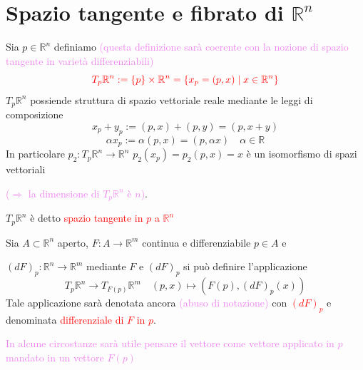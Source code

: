     \section{Spazio tangente e fibrato di \texorpdfstring{$\mathbb{R}^n$}{R\textasciicircum n}}
        \begin{definizione}
        Sia $p \in \mathbb{R}^n$ definiamo \textcolor{violet}{(questa definizione sarà coerente con la nozione di spazio tangente in varietà differenziabili)}
        \begin{equation}
        \label{eq:definizione_spazio_tangente_in_un_punto_a_Rn}
        \color{red} T_p \mathbb{R}^n := \left\{p\right\} \times \mathbb{R}^n = \left\{x_p=(p,x) \mid x \in \mathbb{R}^n \right\}
        \end{equation}
        $T_p \mathbb{R}^n$ possiende struttura di spazio vettoriale reale mediante le leggi di composizione
        \[ x_p + y_p := (p,x) + (p,y) = (p,x+y) \]
        \[ \alpha x_p := \alpha (p,x) = (p, \alpha x) \quad \alpha \in \mathbb{R}\]
        In particolare $p_2: T_p \mathbb{R}^n \to \mathbb{R}^n$ $p_2(x_p) = p_2(p,x) = x$ è un isomorfismo di spazi vettoriali 
        
        \textcolor{violet}{($\Rightarrow$ la dimensione di $T_p \mathbb{R}^n$ è $n$)}.

        $T_p \mathbb{R}^n$ è detto \textcolor{red}{spazio tangente in $p$ a $\mathbb{R}^n$}
        \end{definizione}
        \begin{definizione}
        Sia $A \subset \mathbb{R}^n$ aperto, $F: A \to \mathbb{R}^m$ continua e differenziabile $p \in A$ e 
        
        $\left(dF\right)_p: \mathbb{R}^n \to \mathbb{R}^m$ mediante $F$
        e $\left(dF\right)_p$ si può definire l'applicazione 
        \[ T_p \mathbb{R}^n \to T_{F(p)} \mathbb{R}^m \quad (p,x) \mapsto (F(p), \left(dF\right)_p(x)) \]
        Tale applicazione sarà denotata ancora \textcolor{violet}{(abuso di notazione)} con \textcolor{red}{$\left(dF\right)_p$} e denominata \textcolor{red}{differenziale di $F$ in $p$}.
        
        \textcolor{violet}{In alcune circostanze sarà utile pensare il vettore come vettore applicato in $p$ mandato in un vettore $F(p)$}
        \end{definizione}
